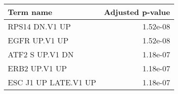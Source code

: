 \begin{tabular}{lr}
\toprule
           Term name &  Adjusted p-value \\
\midrule
      RPS14 DN.V1 UP &          1.52e-08 \\
       EGFR UP.V1 UP &          1.52e-08 \\
     ATF2 S UP.V1 DN &          1.18e-07 \\
       ERB2 UP.V1 UP &          1.18e-07 \\
ESC J1 UP LATE.V1 UP &          1.18e-07 \\
\bottomrule
\end{tabular}
